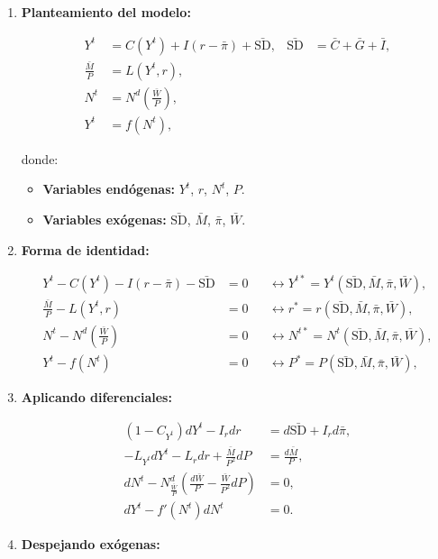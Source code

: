 \documentclass[
  doc,
  floatsintext,
  longtable,
  a4paper,
  nolmodern,
  notxfonts,
  notimes,
  colorlinks=true,linkcolor=blue,citecolor=blue,urlcolor=blue]{apa7}
\providecommand{\tightlist}{%
  \setlength{\itemsep}{0pt}\setlength{\parskip}{0pt}}
\begin{document}
\begin{enumerate}
\def\labelenumi{\arabic{enumi}.}
\item
  \textbf{Planteamiento del modelo:}

  \[
  \begin{aligned}
  Y^t &= C(Y^t) + I(r - \bar{\pi}) + \bar{\mathrm{SD}}, & \bar{\mathrm{SD}} &= \bar{C} + \bar{G} + \bar{I}, \\
  \frac{\bar{M}}{P} &= L(Y^t, r), \\
  N^t &= N^d \left( \frac{\bar{W}}{P} \right), \\
  Y^t &= f(N^t),
  \end{aligned}
  \]

  donde:

  \begin{itemize}
  \tightlist
  \item
    \textbf{Variables endógenas:} \(Y^t\), \(r\), \(N^t\), \(P\).
  \item
    \textbf{Variables exógenas:} \(\bar{\mathrm{SD}}\), \(\bar{M}\),
    \(\bar{\pi}\), \(\bar{W}\).
  \end{itemize}
\item
  \textbf{Forma de identidad:}

  \[
  \begin{aligned}
  Y^t - C(Y^t) - I(r - \bar{\pi}) - \bar{\mathrm{SD}} &= 0 & &\leftrightarrow Y^{t*} = Y^t(\bar{\mathrm{SD}}, \bar{M}, \bar{\pi}, \bar{W}), \\
  \frac{\bar{M}}{P} - L(Y^t, r) &= 0 & &\leftrightarrow r^* = r(\bar{\mathrm{SD}}, \bar{M}, \bar{\pi}, \bar{W}), \\
  N^t - N^d \left( \frac{\bar{W}}{P} \right) &= 0 & &\leftrightarrow N^{t*} = N^t(\bar{\mathrm{SD}}, \bar{M}, \bar{\pi}, \bar{W}), \\
  Y^t - f(N^t) &= 0 & &\leftrightarrow P^* = P(\bar{\mathrm{SD}}, \bar{M}, \bar{\pi}, \bar{W}),
  \end{aligned}
  \]
\item
  \textbf{Aplicando diferenciales:}

  \[
  \begin{aligned}
  (1 - C_{Y^t}) dY^t - I_r dr &= d\bar{\mathrm{SD}} + I_r d\bar{\pi}, \\
  -L_{Y^t} dY^t - L_r dr + \frac{\bar{M}}{P^2} dP &= \frac{d\bar{M}}{P}, \\
  dN^t - N^d_{\frac{\bar{W}}{P}} \left( \frac{d\bar{W}}{P} - \frac{\bar{W}}{P^2} dP \right) &= 0, \\
  dY^t - f'(N^t) dN^t &= 0.
  \end{aligned}
  \]
\item
  \textbf{Despejando exógenas:}


\end{enumerate}
\end{document}
